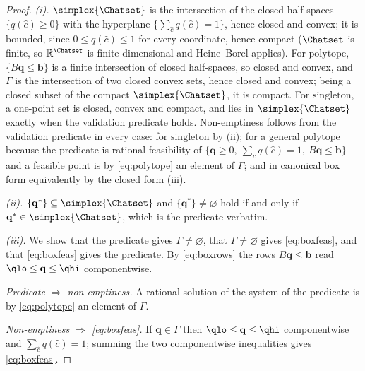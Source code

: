 \begin{proof}
\emph{(i).} $\simplex{\Chatset}$ is the intersection of the closed half-spaces
$\{q(\hat c)\ge0\}$ with the hyperplane $\{\sum_{\hat c}q(\hat c)=1\}$, hence
closed and convex; it is bounded, since $0\le q(\hat c)\le1$ for every
coordinate, hence compact ($\Chatset$ is finite, so
$\mathbb{R}^{\Chatset}$ is finite-dimensional and Heine--Borel applies). For
$\mathrm{polytope}$, $\{B\mathbf{q}\le\mathbf{b}\}$ is a finite intersection
of closed half-spaces, so closed and convex, and $\Gamma$ is the intersection
of two closed convex sets, hence closed and convex; being a closed subset of
the compact $\simplex{\Chatset}$, it is compact. For $\mathrm{singleton}$, a
one-point set is closed, convex and compact, and lies in $\simplex{\Chatset}$
exactly when the validation predicate holds. Non-emptiness follows from the
validation predicate in every case: for $\mathrm{singleton}$ by (ii); for a
general $\mathrm{polytope}$ because the predicate is rational feasibility of
$\{\mathbf{q}\ge0,\ \sum_{\hat c}q(\hat c)=1,\ B\mathbf{q}\le\mathbf{b}\}$ and
a feasible point is by \eqref{eq:polytope} an element of $\Gamma$; and in
canonical box form equivalently by the closed form (iii).

\emph{(ii).} $\{\mathbf{q}^{\ast}\}\subseteq\simplex{\Chatset}$ and
$\{\mathbf{q}^{\ast}\}\neq\varnothing$ hold if and only if
$\mathbf{q}^{\ast}\in\simplex{\Chatset}$, which is the predicate verbatim.

\emph{(iii).} We show that the predicate gives $\Gamma\neq\varnothing$, that
$\Gamma\neq\varnothing$ gives \eqref{eq:boxfeas}, and that
\eqref{eq:boxfeas} gives the predicate. By \eqref{eq:boxrows} the rows
$B\mathbf{q}\le\mathbf{b}$ read $\qlo\le\mathbf{q}\le\qhi$ componentwise.

\emph{Predicate $\Rightarrow$ non-emptiness.} A rational solution of the
system of the predicate is by \eqref{eq:polytope} an element of $\Gamma$.

\emph{Non-emptiness $\Rightarrow$ \eqref{eq:boxfeas}.} If
$\mathbf{q}\in\Gamma$ then $\qlo\le\mathbf{q}\le\qhi$ componentwise and
$\sum_{\hat c}q(\hat c)=1$; summing the two componentwise inequalities gives
\eqref{eq:boxfeas}.


\end{proof}
